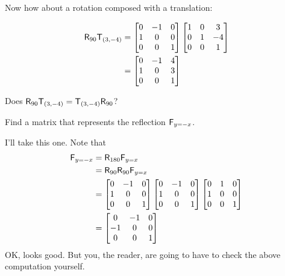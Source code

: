 Now how about a rotation composed with a translation:

\begin{align*}
\mathsf{R}_{90}\mathsf{T}_{(3,-4)} &= \begin{bmatrix}
0 & -1 & 0\\
1 & 0 & 0\\
0 & 0 & 1
\end{bmatrix}
\begin{bmatrix}
1 & 0 & 3\\
0 & 1 & -4\\
0 & 0 & 1
\end{bmatrix}\\
&=
\begin{bmatrix}
0 & -1 & 4\\
1 & 0 & 3\\
0 & 0 & 1
\end{bmatrix}
\end{align*}

\begin{ques}
Does $\mathsf{R}_{90}\mathsf{T}_{(3,-4)}= \mathsf{T}_{(3,-4)}\mathsf{R}_{90}$?
\end{ques}
\QM

\begin{ques} Find a matrix that represents the reflection $\mathsf{F}_{y=-x}$.
\end{ques}

I'll take this one. Note that 
\begin{align*}
\mathsf{F}_{y=-x} &= \mathsf{R}_{180} \mathsf{F}_{y=x} \\
&= \mathsf{R}_{90}\mathsf{R}_{90} \mathsf{F}_{y=x}\\
&= \begin{bmatrix}
0 & -1 & 0\\
1 & 0 & 0\\
0 & 0 & 1
\end{bmatrix}
\begin{bmatrix}
0 & -1 & 0\\
1 & 0 & 0\\
0 & 0 & 1
\end{bmatrix}
\begin{bmatrix}
0&  1 & 0\\
1 & 0 & 0\\
0 &  0 & 1
\end{bmatrix} \\
&=\begin{bmatrix}
0 &  -1 & 0\\
-1 & 0 & 0\\
0 &  0 & 1
\end{bmatrix} 
\end{align*}
OK, looks good.  But you, the reader, are going to have to check the
above computation yourself.



